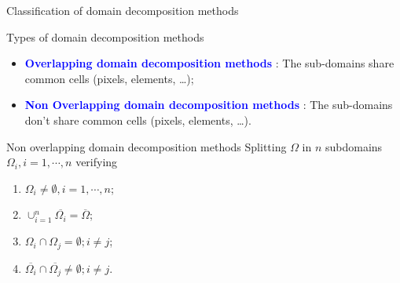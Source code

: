 \documentclass[compress,10pt,aspectratio=169]{beamer}
\begin{document}
\begin{frame}[fragile]{Classification of domain decomposition methods}
    \scriptsize

    \begin{block}{\small Types of domain decomposition methods}
        \begin{itemize}
            \item \textcolor{blue}{\bf Overlapping domain decomposition methods} : The sub-domains share common cells (pixels, elements, \dots);
            \item \textcolor{blue}{\bf Non Overlapping domain decomposition methods} : The sub-domains don't share common cells (pixels, elements, \dots).
        \end{itemize}
    \end{block}

    \begin{multicols}{2}
    \begin{alertblock}{\small Non overlapping domain decomposition methods}
        Splitting $\Omega$ in $n$ subdomains $\Omega_{i}, i=1,\cdots,n$ verifying 
        \begin{enumerate}
            \item $\Omega_{i}\neq \emptyset, i=1,\cdots,n$;
            \item $\cup_{i=1}^{n} \overline{\Omega_{i}} = \overline{\Omega}$;
            \item $\Omega_{i} \cap \Omega_{j} = \emptyset; i\neq j$;
            \item $\overline{\Omega_{i}} \cap \overline{\Omega_{j}} \neq \emptyset; i\neq j$.
        \end{enumerate}
    \end{alertblock}

    \begin{figure}
\end{figure}
\end{multicols}
\end{frame}
\end{document}
